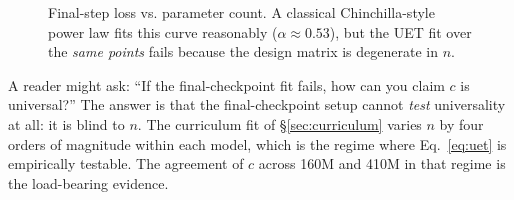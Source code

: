 \begin{figure}[H]
\centering
{}
\caption{Final-step loss vs. parameter count. A classical Chinchilla-style
power law fits this curve reasonably ($\alpha \approx 0.53$), but the
UET fit over the \emph{same points} fails because the design matrix is
degenerate in $n$.}
\label{fig:scaling-final}
\end{figure}

\begin{remark}
A reader might ask: ``If the final-checkpoint fit fails, how can you
claim $c$ is universal?'' The answer is that the final-checkpoint
setup cannot \emph{test} universality at all: it is blind to $n$. The
curriculum fit of \S\ref{sec:curriculum} varies $n$ by four orders of
magnitude within each model, which is the regime where Eq.~\eqref{eq:uet}
is empirically testable. The agreement of $c$ across 160M and 410M in
that regime is the load-bearing evidence.
\end{remark}
